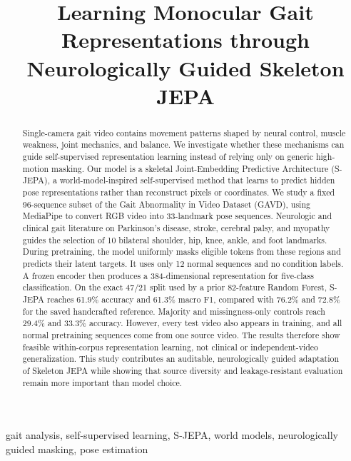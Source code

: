 \documentclass[conference]{IEEEtran}
\title{Learning Monocular Gait Representations through Neurologically Guided Skeleton JEPA}
\author{
\IEEEauthorblockN{Alex Mui, Penny Inouye, Theodore Mui, and Phil Mui}
\IEEEauthorblockA{\textit{Aspiring Scholars Directed Research Program (ASDRP)}\\
\texttt{alexander.mui@students.asdrp.org} \quad \texttt{pennypenelopesf@gmail.com}\\
\texttt{theodoremui@gmail.com} \quad \texttt{phil.mui@asdrp.org}}
}
\begin{document}
\maketitle

\begin{abstract}
Single-camera gait video contains movement patterns shaped by neural control, muscle weakness, joint mechanics, and balance. We investigate whether these mechanisms can guide self-supervised representation learning instead of relying only on generic high-motion masking. Our model is a skeletal Joint-Embedding Predictive Architecture (S-JEPA), a world-model-inspired self-supervised method that learns to predict hidden pose representations rather than reconstruct pixels or coordinates. We study a fixed 96-sequence subset of the Gait Abnormality in Video Dataset (GAVD), using MediaPipe to convert RGB video into 33-landmark pose sequences. Neurologic and clinical gait literature on Parkinson's disease, stroke, cerebral palsy, and myopathy guides the selection of 10 bilateral shoulder, hip, knee, ankle, and foot landmarks. During pretraining, the model uniformly masks eligible tokens from these regions and predicts their latent targets. It uses only 12 normal sequences and no condition labels. A frozen encoder then produces a 384-dimensional representation for five-class classification. On the exact 47/21 split used by a prior 82-feature Random Forest, S-JEPA reaches 61.9\% accuracy and 61.3\% macro F1, compared with 76.2\% and 72.8\% for the saved handcrafted reference. Majority and missingness-only controls reach 29.4\% and 33.3\% accuracy. However, every test video also appears in training, and all normal pretraining sequences come from one source video. The results therefore show feasible within-corpus representation learning, not clinical or independent-video generalization. This study contributes an auditable, neurologically guided adaptation of Skeleton JEPA while showing that source diversity and leakage-resistant evaluation remain more important than model choice.
\end{abstract}

\begin{IEEEkeywords}
gait analysis, self-supervised learning, S-JEPA, world models, neurologically guided masking, pose estimation
\end{IEEEkeywords}
\end{document}
